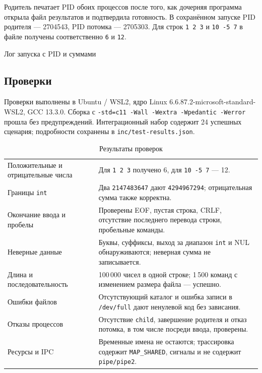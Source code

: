 \documentclass[12pt,a4paper]{article}
\begin{document}
Родитель печатает PID обоих процессов после того, как дочерняя программа открыла файл результатов и подтвердила готовность. В сохранённом запуске PID родителя --- 2704543, PID потомка --- 2705303. Для строк \texttt{1 2 3} и \texttt{10 -5 7} в файле получены соответственно \texttt{6} и \texttt{12}.

\begin{listingblock}{Лог запуска с PID и суммами}
\end{listingblock}

\subsection{Проверки}
Проверки выполнены в Ubuntu / WSL2, ядро Linux 6.6.87.2-microsoft-standard-WSL2, GCC 13.3.0. Сборка с \texttt{-std=c11 -Wall -Wextra -Wpedantic -Werror} прошла без предупреждений. Интеграционный набор содержит 24 успешных сценария; подробности сохранены в \texttt{inc/test-results.json}.

\begin{table}[H]
\caption{Результаты проверок}
\small
\begin{tabularx}{\linewidth}{|P{5cm}|L|}
\hline
{} & \\ \hline
Положительные и отрицательные числа & Для \texttt{1 2 3} получено 6, для \texttt{10 -5 7} --- 12.\\ \hline
Границы \texttt{int} & Два \texttt{2147483647} дают \texttt{4294967294}; отрицательная сумма также корректна.\\ \hline
Окончание ввода и пробелы & Проверены EOF, пустая строка, CRLF, отсутствие последнего перевода строки, пробельные команды.\\ \hline
Неверные данные & Буквы, суффиксы, выход за диапазон \texttt{int} и NUL обнаруживаются; неверная сумма не записывается.\\ \hline
Длина и последовательность & 100\,000 чисел в одной строке; 1\,500 команд с изменением размера файла --- успешно.\\ \hline
Ошибки файлов & Отсутствующий каталог и ошибка записи в \texttt{/dev/full} дают ненулевой код без зависания.\\ \hline
Отказы процессов & Отсутствие \texttt{child}, завершение родителя и отказ потомка, в том числе посреди ввода, проверены.\\ \hline
Ресурсы и IPC & Временные имена не остаются; трассировка содержит \texttt{MAP\_SHARED}, сигналы и не содержит \texttt{pipe/pipe2}.\\ \hline
\end{tabularx}
\end{table}
\end{document}
